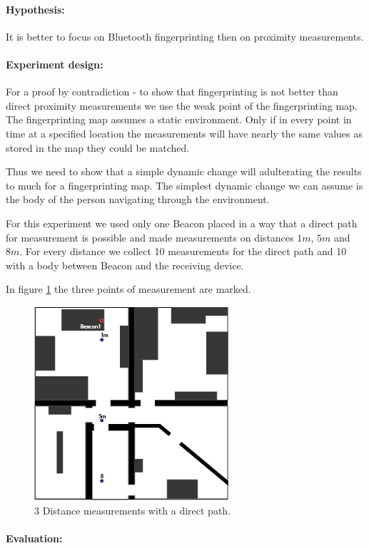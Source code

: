 \paragraph{Hypothesis: } 
It is better to focus on Bluetooth fingerprinting then on proximity measurements. 

\paragraph{Experiment design: } 
For a proof by contradiction - to show that fingerprinting is not better than direct proximity measurements we use the weak point of the fingerprinting map. The fingerprinting map assumes a static environment. Only if in every point in time at a specified location the measurements will have nearly the same values as stored in the map they could be matched.

Thus we need to show that a simple dynamic change will adulterating the results to much for a fingerprinting map. The simplest dynamic change we can assume is the body of the person navigating through the environment. 

For this experiment we used only one Beacon placed in a way that a direct path for measurement is possible and made measurements on distances $1m$, $5m$ and $8m$. For every distance we collect 10 measurements for the direct path and 10 with a body between Beacon and the receiving device. 

In figure \ref{fig:proxWithB1} the three points of measurement are marked. 

\begin{figure}[h]
	\centering
		\includegraphics[width=.4\textwidth]{images/floorplan2ndf+normung.png}
	\caption{3 Distance measurements with a direct path.}
	\label{fig:proxWithB1}
\end{figure}

\paragraph{Evaluation: }
 
